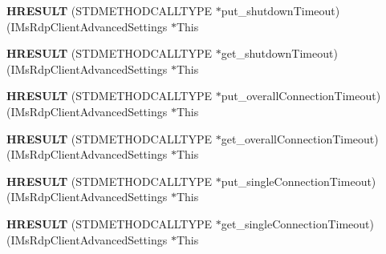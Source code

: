 \begin{DoxyCompactItemize}
\mbox{\label{struct_i_ms_rdp_client_advanced_settings_vtbl_a126b6f86e60f74e29763a6042300fb63}} 
{\bfseries H\+R\+E\+S\+U\+LT} (S\+T\+D\+M\+E\+T\+H\+O\+D\+C\+A\+L\+L\+T\+Y\+PE $\ast$put\+\_\+shutdown\+Timeout)(I\+Ms\+Rdp\+Client\+Advanced\+Settings $\ast$This
\item 
\mbox{\label{struct_i_ms_rdp_client_advanced_settings_vtbl_a9eefe03f0d66e3a2942a8e7f610a3ec2}} 
{\bfseries H\+R\+E\+S\+U\+LT} (S\+T\+D\+M\+E\+T\+H\+O\+D\+C\+A\+L\+L\+T\+Y\+PE $\ast$get\+\_\+shutdown\+Timeout)(I\+Ms\+Rdp\+Client\+Advanced\+Settings $\ast$This
\item 
\mbox{\label{struct_i_ms_rdp_client_advanced_settings_vtbl_a1f4c23b6d390a5e58c1c8264a9f68850}} 
{\bfseries H\+R\+E\+S\+U\+LT} (S\+T\+D\+M\+E\+T\+H\+O\+D\+C\+A\+L\+L\+T\+Y\+PE $\ast$put\+\_\+overall\+Connection\+Timeout)(I\+Ms\+Rdp\+Client\+Advanced\+Settings $\ast$This
\item 
\mbox{\label{struct_i_ms_rdp_client_advanced_settings_vtbl_aec5b0b0e8627b9e07e30945d11f65297}} 
{\bfseries H\+R\+E\+S\+U\+LT} (S\+T\+D\+M\+E\+T\+H\+O\+D\+C\+A\+L\+L\+T\+Y\+PE $\ast$get\+\_\+overall\+Connection\+Timeout)(I\+Ms\+Rdp\+Client\+Advanced\+Settings $\ast$This
\item 
\mbox{\label{struct_i_ms_rdp_client_advanced_settings_vtbl_a25ef8e1e040166f077cf028b31e03e39}} 
{\bfseries H\+R\+E\+S\+U\+LT} (S\+T\+D\+M\+E\+T\+H\+O\+D\+C\+A\+L\+L\+T\+Y\+PE $\ast$put\+\_\+single\+Connection\+Timeout)(I\+Ms\+Rdp\+Client\+Advanced\+Settings $\ast$This
\item 
\mbox{\label{struct_i_ms_rdp_client_advanced_settings_vtbl_a4507d209d7618710a9224e44555db917}} 
{\bfseries H\+R\+E\+S\+U\+LT} (S\+T\+D\+M\+E\+T\+H\+O\+D\+C\+A\+L\+L\+T\+Y\+PE $\ast$get\+\_\+single\+Connection\+Timeout)(I\+Ms\+Rdp\+Client\+Advanced\+Settings $\ast$This
\item 
\mbox{\label{struct_i_ms_rdp_client_advanced_settings_vtbl_a93b6199a0082ac5d504f4c19d7d24583}} 

\end{DoxyCompactItemize}
